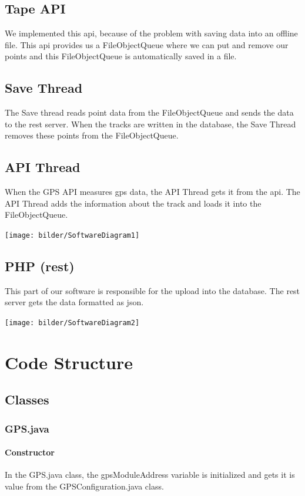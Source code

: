 \subsection{Tape API}
We implemented this \gls{api}, because of the problem with saving data into an offline file. This \gls{api} provides us a FileObjectQueue where we can put and remove our points and this FileObjectQueue is automatically saved in a file. 
\subsection{Save Thread}
The Save thread reads point data from the FileObjectQueue and sends the data to the \gls{rest} server. When the tracks are written in the database, the Save Thread removes these points from the FileObjectQueue.
\subsection{API Thread}
When the GPS API measures \gls{gps} data, the API Thread gets it from the \gls{api}. The API Thread adds the information about the track and loads it into the FileObjectQueue.
\begin{center}
\texttt{[image: bilder/SoftwareDiagram1]}
\end{center} 
\subsection{PHP (\gls{rest})}
This part of our software is responsible for the upload into the database. The \gls{rest} server gets the data formatted as \gls{json}.
\begin{center}
\texttt{[image: bilder/SoftwareDiagram2]}
\end{center} 
\section{Code Structure}
\subsection{Classes}
\subsubsection{GPS.java}
\paragraph{Constructor}
In the GPS.java class, the gpsModuleAddress variable is initialized and gets it is value from the GPSConfiguration.java class.
